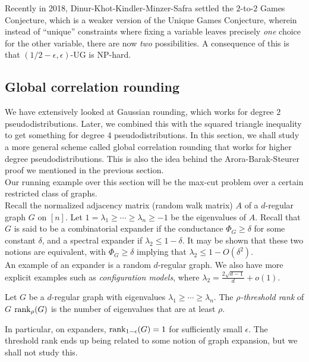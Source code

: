 		Recently in 2018, Dinur-Khot-Kindler-Minzer-Safra \cite{2-2-gc} settled the $2$-to-$2$ Games Conjecture, which is a weaker version of the Unique Games Conjecture, wherein instead of ``unique'' constraints where fixing a variable leaves precisely \emph{one} choice for the other variable, there are now \emph{two} possibilities. A consequence of this is that $(1/2-\epsilon,\epsilon)$-UG is \textsf{NP}-hard.\\


\subsection{Global correlation rounding}

	We have extensively looked at Gaussian rounding, which works for degree $2$ pseudodistributions. Later, we combined this with the squared triangle inequality to get something for degree $4$ pseudodistributions. In this section, we shall study a more general scheme called global correlation rounding that works for higher degree pseudodistributions. This is also the idea behind the Arora-Barak-Steurer proof we mentioned in the previous section.\\
	Our running example over this section will be the max-cut problem over a certain restricted class of graphs.\\

	Recall the normalized adjacency matrix (random walk matrix) $A$ of a $d$-regular graph $G$ on $[n]$. Let $1 = \lambda_1 \ge \cdots \ge \lambda_n \ge -1$ be the eigenvalues of $A$. Recall that $G$ is said to be a combinatorial expander if the conductance $\Phi_G \ge \delta$ for some constant $\delta$, and a spectral expander if $\lambda_2 \le 1-\delta$. It may be shown that these two notions are equivalent, with $\Phi_G \ge \delta$ implying that $\lambda_2 \le 1 - O(\delta^2)$.\\
	An example of an expander is a random $d$-regular graph. We also have more explicit examples such as \emph{configuration models}, where $\lambda_2 = \frac{2\sqrt{d-1}}{d} + o(1)$.

	\begin{fdef}
		Let $G$ be a $d$-regular graph with eigenvalues $\lambda_1 \ge \cdots \ge \lambda_n$. The \emph{$\rho$-threshold rank} of $G$ $\operatorname{rank}_\rho(G)$ is the number of eigenvalues that are at least $\rho$.
	\end{fdef}
	In particular, on expanders, $\operatorname{rank}_{1-\epsilon}(G) = 1$ for sufficiently small $\epsilon$. The threshold rank ends up being related to some notion of graph expansion, but we shall not study this.\\
	

